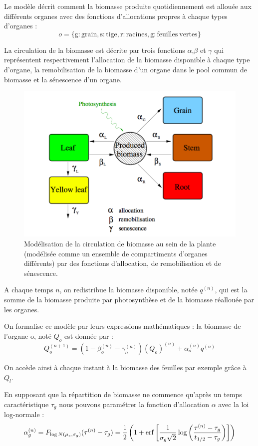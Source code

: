 Le modèle décrit comment la biomasse produite quotidiennement est allouée aux différents organes avec des fonctions d'allocations propres à chaque types d'organes :
\[ o = \{\mathrm{g:grain, s:tige, r:racines, g : feuilles~vertes}\} \]

La circulation de la biomasse est décrite par trois fonctions $\alpha$,$\beta$ et $\gamma$ qui représentent respectivement l'allocation de la biomasse disponible à chaque type d'organe, la remobilisation de la biomasse d'un organe dans le pool commun de biomasse et la sénescence d'un organe.

\begin{figure}[h]
\centering
  \includegraphics[scale=0.37]{./img/schema-lnas.png}
  \caption{Modélisation de la circulation de biomasse au sein de la plante (modélisée comme un ensemble de compartiments d'organes différents) par des fonctions d'allocation, de remobilisation et de sénescence.}
  \label{fig:circulation_biomasse}
\end{figure}

A chaque temps $n$, on redistribue la biomasse disponible, notée $q^{(n)}$, qui est la somme de la biomasse produite par photosynthèse et de la biomasse réallouée par les organes.

On formalise ce modèle par leurs expressions mathématiques : 
la biomasse de l'organe o, noté $Q_o$ est donnée par :
\[ {Q_o^{(n+1)}} = (1-\beta_o^{(n)}-\gamma_o^{(n)} )(Q_o)^{(n)} +\alpha_o^{(n)}q^{(n)} \]

On accède ainsi à chaque instant à la biomasse des feuilles par exemple grâce à $Q_l$.

En supposant que la répartition de biomasse ne commence qu'après un temps caractéristique $\tau_g$ nous pouvons paramétrer la fonction d'allocation $\alpha$ avec la loi log-normale :
\[ 
{\alpha_g^{(n)}}=F_{\log N(\mu_s,\sigma_g)}(\tau^{(n)}-\tau_g)=\frac{1}{2} \left(1+\operatorname{erf}\left[\frac{1}{\sigma_g \sqrt{2}}\log\left(\frac{\tau^{(n)}-\tau_g}{t_{1/2}-\tau_g}\right)\right]\right) \]

